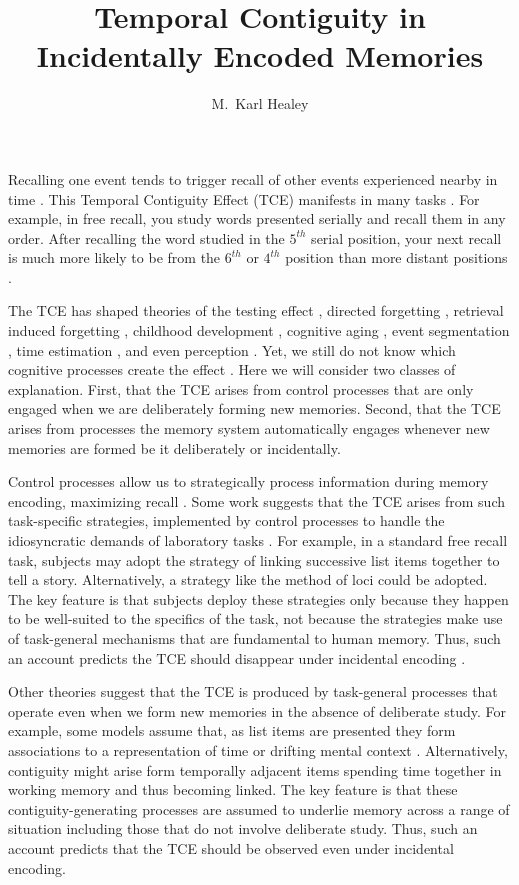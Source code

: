 \documentclass[jou,natbib,floatsintext]{apa6} %
\title{Temporal Contiguity in Incidentally Encoded Memories}
\author{M.\ Karl Healey}
\affiliation{Michigan State University}
\begin{document}
\maketitle

Recalling one event tends to trigger recall of other events experienced nearby in time \citep{HealKaha17}. This Temporal Contiguity Effect (TCE) manifests in many tasks \citep{DaviEtal08,SchwEtal05}. For example, in free recall, you study words presented serially and recall them in any order. After recalling the word studied in the $5^{th}$ serial position, your next recall is much more likely to be from the $6^{th}$ or $4^{th}$ position than more distant positions \citep{Kaha96}. 

The TCE has shaped theories of the testing effect \citep{KarpEtal14}, directed forgetting \citep{SahaEtal13}, retrieval induced forgetting \citep{KlieBaum16}, childhood development \citep{JarroEtal15}, cognitive aging \citep{WahlHuff15,HealKaha15}, event segmentation \citep{EzzyDava14}, time estimation \citep{SahaSmit13}, and even perception \citep{TurkEtal12}. Yet, we still do not know which cognitive processes create the effect \citep{HealKaha17}. Here we will consider two classes of explanation. First, that the TCE arises from control processes that are only engaged when we are deliberately forming new memories. Second, that the TCE arises from processes the memory system automatically engages whenever new memories are formed be it deliberately or incidentally.   

Control processes \citep{LehmMalm13,RaaiShif81} allow us to strategically process information during memory encoding, maximizing recall \citep[e.g.,][]{Unsw16}. Some work suggests that the TCE arises from such task-specific strategies, implemented by control processes to handle the idiosyncratic demands of laboratory tasks \citep{Hint16}. For example, in a standard free recall task, subjects may adopt the strategy of linking successive list items together to tell a story. Alternatively, a strategy like the method of loci could be adopted. The key feature is that subjects deploy these strategies only because they happen to be well-suited to the specifics of the task, not because the strategies make use of task-general mechanisms that are fundamental to human memory. Thus, such an account predicts the TCE should disappear under incidental encoding \citep{Hint16}.

Other theories suggest that the TCE is produced by task-general processes that operate even when we form new memories in the absence of deliberate study. For example, some models assume that, as list items are presented they form associations to a representation of time \citep{HowaEtal14a,BrowEtal07} or drifting mental context \citep{LohnEtal14}. Alternatively, contiguity might arise form temporally adjacent items spending time together in working memory and thus becoming linked. The key feature is that these contiguity-generating processes are assumed to underlie memory across a range of situation including those that do not involve deliberate study. Thus, such an account  predicts that the TCE should be observed even under incidental encoding.
\end{document}
